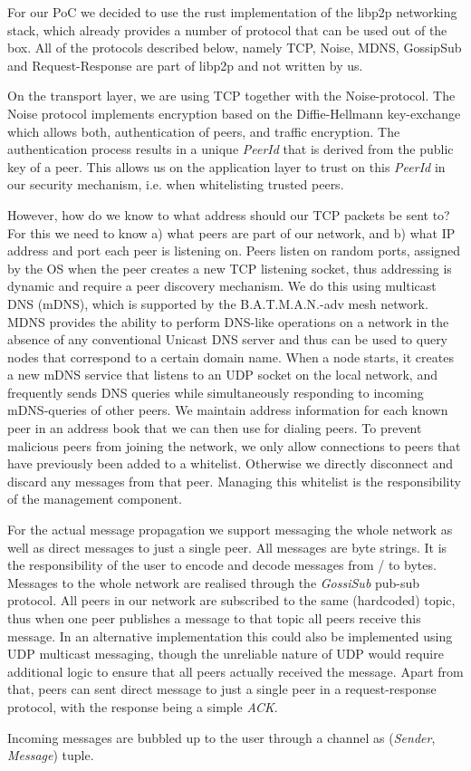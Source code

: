 For our PoC we decided to use the rust implementation of the libp2p networking stack, which already provides a number of protocol that can be used out of the box. All of the protocols described below, namely TCP, Noise, MDNS, GossipSub and Request-Response are part of libp2p and not written by us.

On the transport layer, we are using TCP together with the Noise-protocol. 
The Noise protocol implements encryption based on the Diffie-Hellmann key-exchange which allows both, authentication of peers, and traffic encryption. 
The authentication process results in a unique \textit{PeerId} that is derived from the public key of a peer. 
This allows us on the application layer to trust on this \textit{PeerId} in our security mechanism, i.e. when whitelisting trusted peers.

However, how do we know to what address should our TCP packets be sent to?
For this we need to know a) what peers are part of our network, and b) what IP address and port each peer is listening on. 
Peers listen on random ports, assigned by the OS when the peer creates a new TCP listening socket, thus addressing is dynamic and require a peer discovery mechanism. 
We do this using multicast DNS (mDNS), which is supported by the B.A.T.M.A.N.-adv mesh network.
MDNS provides the ability to perform DNS-like operations on a network in the absence of any conventional Unicast DNS server and thus can be used to query nodes that correspond to a certain domain name.
When a node starts, it creates a new mDNS service that listens to an UDP socket on the local network, and frequently sends DNS queries while simultaneously responding to incoming mDNS-queries of other peers.
We maintain address information for each known peer in an address book that we can then use for dialing peers. 
To prevent malicious peers from joining the network, we only allow connections to peers that have previously been added to a whitelist. 
Otherwise we directly disconnect and discard any messages from that peer.
Managing this whitelist is the responsibility of the management component. 

For the actual message propagation we support messaging the whole network as well as direct messages to just a single peer.
All messages are byte strings. 
It is the responsibility of the user to encode and decode messages from / to bytes.
Messages to the whole network are realised through the \textit{GossiSub} pub-sub protocol. 
All peers in our network are subscribed to the same (hardcoded) topic, thus when one peer publishes a message to that topic all peers receive this message. 
In an alternative implementation this could also be implemented using UDP multicast messaging, though the unreliable nature of UDP would require additional logic to ensure that all peers actually received the message.
Apart from that, peers can sent direct message to just a single peer in a request-response protocol, with the response being a simple \textit{ACK}.

Incoming messages are bubbled up to the user through a channel as (\textit{Sender}, \textit{Message}) tuple.